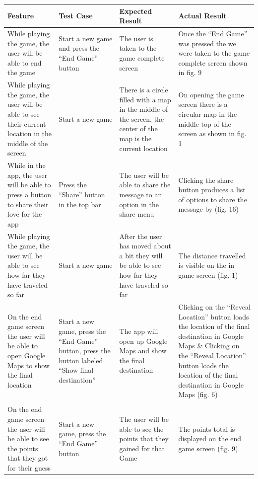 \documentclass[10pt, a4paper]{article}
\begin{document}
\begin{tabular}{| p{} | p{} | p{} | p{} |}
\hline 
\textbf{Feature}
& \textbf{Test Case}
& \textbf{Expected Result}
& \textbf{Actual Result} \\ 
\hline 
While playing the game, the user will be able to end the game
& Start a new game and press the ``End Game'' button
& The user is taken to the game complete screen
& Once the ``End Game'' was pressed the we were taken to the game complete screen shown in fig. 9 \\ 
\hline 
While playing the game, the user will be able to see their current location in the middle of the screen
& Start a new game
& There is a circle filled with a map in the middle of the screen, the center of the map is the current location
& On opening the game screen there is a circular map in the middle top of the screen as shown in fig. 1 \\ 
\hline 
While in the app, the user will be able to press a button to share their love for the app
& Press the ``Share'' button in the top bar
& The user will be able to share the message to an option in the share menu
& Clicking the share button produces a list of options to share the message by (fig. 16)  \\ 
\hline
While playing the game, the user will be able to see how far they have traveled so far
& Start a new game
& After the user has moved about a bit they will be able to see how far they have traveled so far
& The distance travelled is visible on the in game screen (fig. 1)  \\ 
\hline
On the end game screen the user will be able to open Google Maps to show the final location
& Start a new game, press the ``End Game'' button, press the button labeled ``Show final destination''
& The app will open up Google Maps and show the final destination
& Clicking on the ``Reveal Location'' button loads the location of the final destination in Google Maps \& Clicking on the ``Reveal Location'' button loads the location of the final destination in Google Maps (fig. 6)\\ 
\\ 
\hline
On the end game screen the user will be able to see the points that they got for their guess
& Start a new game, press the ``End Game'' button
& The user will be able to see the points that they gained for that Game
& The points total is displayed on the end game screen (fig. 9) \\ 
\hline
\end{tabular} 
\end{document}
